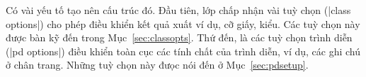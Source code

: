 
Có vài yếu tố tạo nên cấu trúc đó.
Đầu tiên, lớp chấp nhận vài tuỳ chọn (|class options|) cho phép điều khiển kết quả xuất
ví dụ, cỡ giấy, kiểu. Các tuỳ chọn này được bàn kỹ đến trong Mục~\vref{sec:classopts}.
Thứ đến, là các tuỳ chọn trình diễn (|pd options|) điều khiển toàn cục các
tính chất của trình diễn, ví dụ, các ghi chú ở chân trang.
Những tuỳ chọn này đưọc nói đến ở Mục~\vref{sec:pdsetup}.

